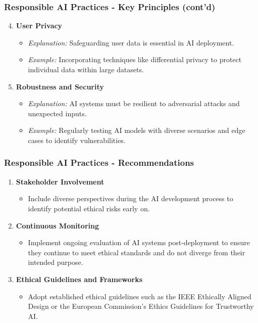 \documentclass{beamer}
\begin{document}
\begin{frame}[fragile]
    \frametitle{Responsible AI Practices - Key Principles (cont'd)}
    \begin{enumerate}
        \setcounter{enumi}{3} %
        \item \textbf{User Privacy}
        \begin{itemize}
            \item \textit{Explanation:} Safeguarding user data is essential in AI deployment.
            \item \textit{Example:} Incorporating techniques like differential privacy to protect individual data within large datasets.
        \end{itemize}
        
        \item \textbf{Robustness and Security}
        \begin{itemize}
            \item \textit{Explanation:} AI systems must be resilient to adversarial attacks and unexpected inputs.
            \item \textit{Example:} Regularly testing AI models with diverse scenarios and edge cases to identify vulnerabilities.
        \end{itemize}
    \end{enumerate}
\end{frame}

\begin{frame}[fragile]
    \frametitle{Responsible AI Practices - Recommendations}
    \begin{enumerate}
        \item \textbf{Stakeholder Involvement}
        \begin{itemize}
            \item Include diverse perspectives during the AI development process to identify potential ethical risks early on.
        \end{itemize}
        
        \item \textbf{Continuous Monitoring}
        \begin{itemize}
            \item Implement ongoing evaluation of AI systems post-deployment to ensure they continue to meet ethical standards and do not diverge from their intended purpose.
        \end{itemize}
        
        \item \textbf{Ethical Guidelines and Frameworks}
        \begin{itemize}
            \item Adopt established ethical guidelines such as the IEEE Ethically Aligned Design or the European Commission’s Ethics Guidelines for Trustworthy AI.
        \end{itemize}
    \end{enumerate}
\end{frame}
\end{document}
